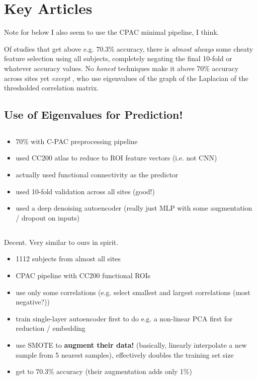 \documentclass[10pt]{article}
\begin{document}
\section{Key Articles} \label{key-articles}

Note for below I also seem to use the CPAC minimal pipeline, I think.

Of studies that get above e.g. 70.3\% accuracy, there is \emph{almost always} some cheaty feature
selection using all subjects, completely negating the final 10-fold or whatever accuracy values. No
\emph{honest} techniques make it above 70\% accuracy across sites yet \emph{except}
\citet{mostafaDiagnosisAutismSpectrum2019,yinDiagnosisAutismSpectrum2021}, who use eigenvalues of
the graph of the Laplacian of the thresholded correlation matrix.

\subsection{Use of Eigenvalues for Prediction! \citet{mostafaDiagnosisAutismSpectrum2019}} \label{eig-pred}



\subsection{\citet{heinsfeldIdentificationAutismSpectrum2018}}

\begin{itemize}
  \item 70\% with C-PAC preprocessing pipeline
  \item used CC200 atlas to reduce to ROI feature vectors (i.e. not CNN)
  \item actually used functional connectivity as the predictor
  \item used 10-fold validation across all sites (good!)
  \item used a deep denoising autoencoder (really just MLP with some augmentation / dropout on inputs)
\end{itemize}
\subsection{\citet{eslamiASDDiagNetHybridLearning2019}}

Decent. Very similar to ours in spirit.

\begin{itemize}
  \item 1112 subjects from almost all sites
  \item CPAC pipeline with CC200 functional ROIs
  \item use only some correlations (e.g. select smallest and largest correlations (most negative?))
  \item train single-layer autoencoder first to do e.g. a non-linear PCA first for reduction /
  embedding
  \item use SMOTE to \textbf{augment their data!} (basically, linearly interpolate a new sample from
  5 nearest samples), effectively doubles the training set size
  \item get to 70.3\% accuracy (their augmentation adds only 1\%)
\end{itemize}
\end{document}
